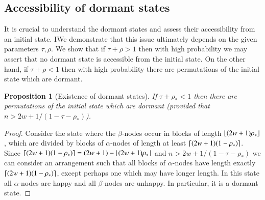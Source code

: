 \documentclass[11pt]{article}
\theoremstyle{plain}
\newtheorem{prop}[thm]{Proposition}
\numberwithin{equation}{subsection}
\DeclarePairedDelimiter{\floor}{\lfloor}{\rfloor}
\begin{document}
\subsection{Accessibility of dormant states}\label{sub:accesdormst} 
It is crucial to
understand the dormant states and assess their accessibility from an initial state.
IWe demonstrate that this issue ultimately depends on the given parameters
$\tau, \rho$. We show  that if $\tau+\rho>1$ then with high probability
we may assert that no dormant state is accessible from the initial state. On the other hand, if 
$\tau+\rho<1$ then with high probability there are permutations of the initial state which are dormant.

\begin{prop}[Existence of dormant states]\label{prop:existdormst}
If $\tau +\rho_{\ast}<1$ then there are permutations of the initial state which are
dormant  (provided that $n>2w+1/(1-\tau-\rho_{\ast})$).
\end{prop}
\begin{proof}
Consider the state where the $\beta$-nodes occur in blocks of length
$\floor{(2w+1)\rho_{\ast}}$, which are divided by blocks of $\alpha$-nodes 
of length at least $\lceil(2w+1)(1-\rho_{\ast})\rceil$.
Since $\ceil{(2w+1)(1-\rho_{\ast})}=(2w+1)-\floor{(2w+1)\rho_{\ast}}$
and $n>2w+1/(1-\tau-\rho_{\ast})$ we can consider an arrangement such that
all blocks of $\alpha$-nodes have length exactly $\lceil(2w+1)(1-\rho_{\ast})\rceil$,
except perhaps one which may have longer length. In this state
all $\alpha$-nodes are happy and all $\beta$-nodes are unhappy.
In particular, it is a dormant state.
\end{proof}
\end{document}
